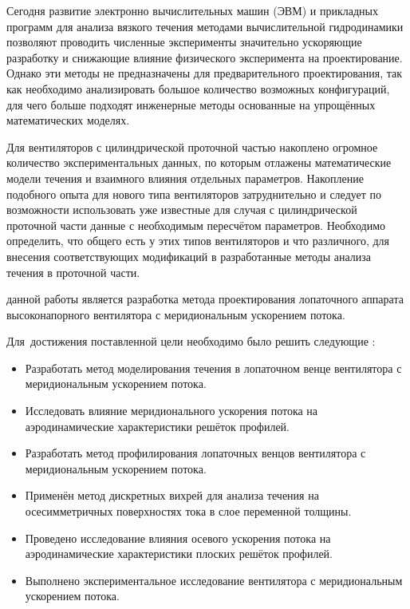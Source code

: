 Сегодня развитие электронно вычислительных машин (ЭВМ) и прикладных программ для анализа вязкого течения методами вычислительной гидродинамики позволяют проводить численные эксперименты значительно ускоряющие разработку и снижающие влияние физического эксперимента на проектирование. Однако эти методы не предназначены для предварительного проектирования, так как необходимо анализировать большое количество возможных конфигураций, для чего больше подходят инженерные методы основанные на упрощённых математических моделях.

Для вентиляторов с цилиндрической проточной частью накоплено огромное количество экспериментальных данных, по которым отлажены математические модели течения и взаимного влияния отдельных параметров. Накопление подобного опыта для нового типа вентиляторов затруднительно и следует по возможности использовать уже известные для случая с цилиндрической проточной части данные с необходимым пересчётом параметров. Необходимо определить, что общего есть у этих типов вентиляторов и что различного, для внесения соответствующих модификаций в разработанные методы анализа течения в проточной части.


{\aim} данной работы является разработка метода проектирования лопаточного аппарата высоконапорного вентилятора с меридиональным ускорением потока.

Для~достижения поставленной цели необходимо было решить следующие {\tasks}:
\begin{itemize}[beginpenalty=10000] %
	\item Разработать метод моделирования течения в лопаточном венце вентилятора с меридиональным ускорением потока.
	\item Исследовать влияние меридионального ускорения потока на аэродинамические характеристики решёток профилей.
	\item Разработать метод профилирования лопаточных венцов вентилятора с меридиональным ускорением потока.
\end{itemize}

{\novelty}
\begin{itemize}[beginpenalty=10000] %
	\item Применён метод дискретных вихрей для анализа течения на осесимметричных поверхностях тока в слое переменной толщины.
	\item Проведено исследование влияния осевого ускорения потока на аэродинамические характеристики плоских решёток профилей.
	\item Выполнено экспериментальное исследование вентилятора с меридиональным ускорением потока.
\end{itemize}


